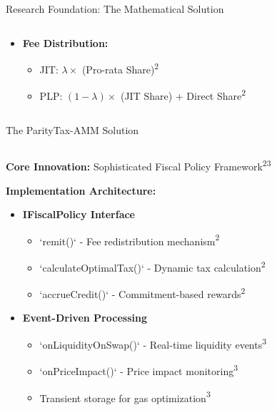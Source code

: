 \documentclass[aspectratio=169]{beamer}
\newcommand{\citecapponi}{\textcolor{paritygreen}{\textsuperscript{2}}}
\newcommand{\citema}{\textcolor{parityorange}{\textsuperscript{3}}}
\begin{document}
\begin{frame}{Research Foundation: The Mathematical Solution}
\begin{columns}
\begin{column}{0.5\textwidth}
\begin{itemize}
                \item \textcolor{parityblue}{\textbf{Fee Distribution:}}
                \begin{itemize}
                    \item JIT: $\lambda \times$ (Pro-rata Share)\citecapponi
                    \item PLP: $(1-\lambda) \times$ (JIT Share) + Direct Share\citecapponi
                \end{itemize}
            \end{itemize}
        \end{column}
    \end{columns}
\end{frame}

\begin{frame}{The ParityTax-AMM Solution}
    \begin{columns}
        \begin{column}{0.6\textwidth}
            \textbf{Core Innovation:}
            \textcolor{parityblue}{\Large Sophisticated Fiscal Policy Framework}\citecapponi\citema
            
            \vspace{0.5cm}
            \textbf{Implementation Architecture:}
            \begin{itemize}
                \item \textcolor{paritygreen}{\textbf{IFiscalPolicy Interface}}
                \begin{itemize}
                    \item `remit()` - Fee redistribution mechanism\citecapponi
                    \item `calculateOptimalTax()` - Dynamic tax calculation\citecapponi
                    \item `accrueCredit()` - Commitment-based rewards\citecapponi
                \end{itemize}
                
                \item \textcolor{paritygreen}{\textbf{Event-Driven Processing}}
                \begin{itemize}
                    \item `onLiquidityOnSwap()` - Real-time liquidity events\citema
                    \item `onPriceImpact()` - Price impact monitoring\citema
                    \item Transient storage for gas optimization\citema
                \end{itemize}
                

\end{itemize}
\end{column}
\end{columns}
\end{frame}
\end{document}
